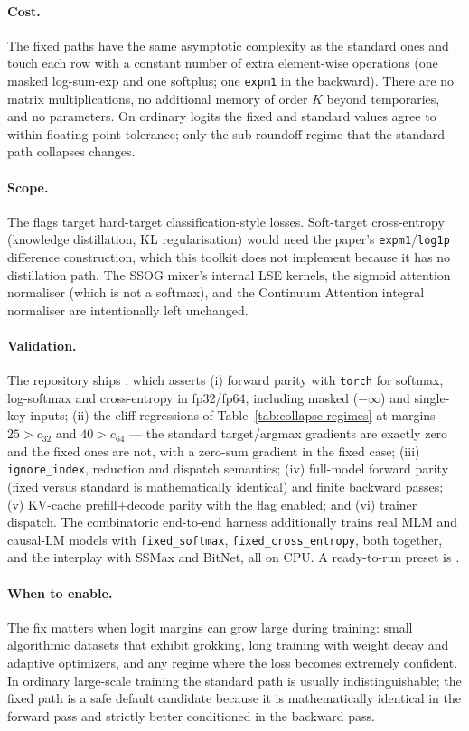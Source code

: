 \paragraph{Cost.} The fixed paths have the same asymptotic complexity as the standard ones and touch each row with a constant number of extra element-wise operations (one masked log-sum-exp and one softplus; one \texttt{expm1} in the backward). There are no matrix multiplications, no additional memory of order $K$ beyond temporaries, and no parameters. On ordinary logits the fixed and standard values agree to within floating-point tolerance; only the sub-roundoff regime that the standard path collapses changes.

\paragraph{Scope.} The flags target hard-target classification-style losses. Soft-target cross-entropy (knowledge distillation, KL regularisation) would need the paper's \texttt{expm1}/\texttt{log1p} difference construction, which this toolkit does not implement because it has no distillation path. The SSOG mixer's internal LSE kernels, the sigmoid attention normaliser (which is not a softmax), and the Continuum Attention integral normaliser are intentionally left unchanged.

\paragraph{Validation.} The repository ships , which asserts (i) forward parity with \texttt{torch} for softmax, log-softmax and cross-entropy in fp32/fp64, including masked ($-\infty$) and single-key inputs; (ii) the cliff regressions of Table~\ref{tab:collapse-regimes} at margins $25 > c_{32}$ and $40 > c_{64}$ --- the standard target/argmax gradients are exactly zero and the fixed ones are not, with a zero-sum gradient in the fixed case; (iii) \texttt{ignore\_index}, reduction and dispatch semantics; (iv) full-model forward parity (fixed versus standard is mathematically identical) and finite backward passes; (v) KV-cache prefill$+$decode parity with the flag enabled; and (vi) trainer dispatch. The combinatoric end-to-end harness additionally trains real MLM and causal-LM models with \texttt{fixed\_softmax}, \texttt{fixed\_cross\_entropy}, both together, and the interplay with SSMax and BitNet, all on CPU. A ready-to-run preset is .

\paragraph{When to enable.} The fix matters when logit margins can grow large during training: small algorithmic datasets that exhibit grokking, long training with weight decay and adaptive optimizers, and any regime where the loss becomes extremely confident. In ordinary large-scale training the standard path is usually indistinguishable; the fixed path is a safe default candidate because it is mathematically identical in the forward pass and strictly better conditioned in the backward pass.
